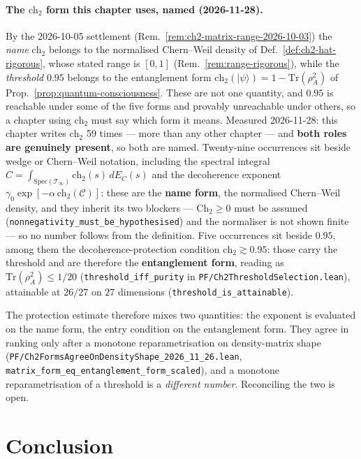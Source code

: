 \paragraph{The $\text{ch}_2$ form this chapter uses, named (2026-11-28).}
By the 2026-10-05 settlement (Rem.~\ref{rem:ch2-matrix-range-2026-10-03}) the
\emph{name} $\text{ch}_2$ belongs to the normalised Chern--Weil density of
Def.~\ref{def:ch2-hat-rigorous}, whose stated range is $[0,1]$
(Rem.~\ref{rem:range-rigorous}), while the \emph{threshold} $0.95$ belongs to the
entanglement form $\text{ch}_2(|\psi\rangle) = 1 - \mathrm{Tr}(\rho_A^2)$ of
Prop.~\ref{prop:quantum-consciousness}. These are not one quantity, and $0.95$ is
reachable under some of the five forms and provably unreachable under others, so a
chapter using $\text{ch}_2$ must say which form it means.
Measured 2026-11-28: this chapter writes $\text{ch}_2$ 59 times --- more than any
other chapter --- and \textbf{both roles are genuinely present}, so both are
named. Twenty-nine occurrences sit beside wedge or Chern--Weil notation,
including the spectral integral $C = \int_{\mathrm{Spec}(\mathcal{T}_\infty)}
\text{ch}_2(s)\,dE_C(s)$ and the decoherence exponent
$\gamma_0 \exp[-\alpha\,\text{ch}_2(\mathcal{C})]$: these are the \textbf{name
form}, the normalised Chern--Weil density, and they inherit its two blockers ---
$\mathrm{Ch}_2 \geq 0$ must be assumed
(\texttt{nonnegativity\_must\_be\_hypothesised}) and the normaliser is not shown
finite --- so no number follows from the definition. Five occurrences sit beside
$0.95$, among them the decoherence-protection condition
$\text{ch}_2 \gtrsim 0.95$: those carry the threshold and are therefore the
\textbf{entanglement form}, reading as
$\mathrm{Tr}(\rho_A^2) \leq 1/20$ (\texttt{threshold\_iff\_purity} in
\texttt{PF/Ch2ThresholdSelection.lean}), attainable at $26/27$ on $27$ dimensions
(\texttt{threshold\_is\_attainable}).

\noindent The protection estimate therefore mixes two quantities: the exponent is
evaluated on the name form, the entry condition on the entanglement form. They
agree in ranking only after a monotone reparametrisation on density-matrix shape
(\texttt{PF/Ch2FormsAgreeOnDensityShape\_2026\_11\_26.lean},
\texttt{matrix\_form\_eq\_entanglement\_form\_scaled}), and a monotone
reparametrisation of a threshold is a \emph{different number}. Reconciling the
two is open.


\section{Conclusion}

